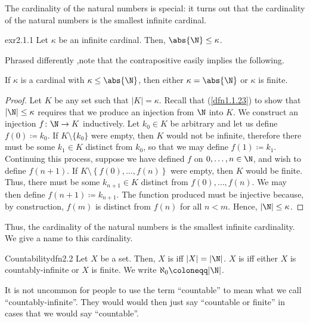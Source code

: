 The cardinality of the natural numbers is special:  it turns out that the cardinality of the natural numbers is the smallest infinite cardinal.
\begin{prp}{}{exr2.1.1}
	Let $\kappa$ be an infinite cardinal.  Then, $\abs{\N}\leq \kappa$.
	\begin{rmk}
		Phrased differently ,note that the contrapositive easily implies the following.
		\begin{displayquote}
			If $\kappa$ is a cardinal with $\kappa \leq \abs{\N}$, then either $\kappa =\abs{\N}$ or $\kappa$ is finite.
		\end{displayquote}
	\end{rmk}
	\begin{proof}
		Let $K$ be any set such that $|K|=\kappa$.  Recall that (\cref{dfn1.1.23}) to show that $|\N |\leq \kappa$ requires that we produce an injection from $\N$ into $K$.  We construct an injection $f\colon \N \rightarrow K$ inductively.  Let $k_0\in K$ be arbitrary and let us define $f(0)\coloneqq k_0$.  If $K\setminus \{ k_0\}$ were empty, then $K$ would not be infinite, therefore there must be some $k_1\in K$ distinct from $k_0$, so that we may define $f(1)\coloneqq k_1$.  Continuing this process, suppose we have defined $f$ on $0,\ldots ,n\in \N$, and wish to define $f(n+1)$.  If $K\setminus \left\{ f(0),\ldots ,f(n)\right\}$ were empty, then $K$ would be finite.  Thus, there must be some $k_{n+1}\in K$ distinct from $f(0),\ldots ,f(n)$.  We may then define $f(n+1)\coloneqq k_{n+1}$.  The function produced must be injective because, by construction, $f(m)$ is distinct from $f(n)$ for all $n<m$.  Hence, $|\N |\leq \kappa$.
	\end{proof}
\end{prp}
Thus, the cardinality of the natural numbers is the smallest infinite cardinality.  We give a name to this cardinality.
\begin{dfn}{Countability}{dfn2.2}
	Let $X$ be a set.  Then, $X$ is  iff $|X|=|\N |$.  $X$ is  iff either $X$ is countably-infinite or $X$ is finite.  We write $\aleph _0\coloneqq |\N |$\index[notation]{$\aleph _0$}.
	\begin{rmk}
		It is not uncommon for people to use the term ``countable'' to mean what we call ``countably-infinite''.  They would would then just say ``countable or finite'' in cases that we would say ``countable''.
	\end{rmk}
\end{dfn}

